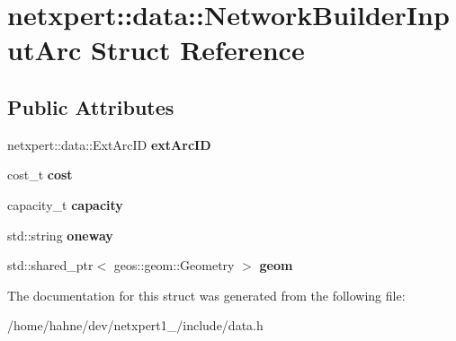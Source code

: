 \hypertarget{structnetxpert_1_1data_1_1NetworkBuilderInputArc}{}\section{netxpert\+:\+:data\+:\+:Network\+Builder\+Input\+Arc Struct Reference}
\label{structnetxpert_1_1data_1_1NetworkBuilderInputArc}
\subsection*{Public Attributes}
\begin{DoxyCompactItemize}
\item 
netxpert\+::data\+::\+Ext\+Arc\+ID {\bfseries ext\+Arc\+ID}\hypertarget{structnetxpert_1_1data_1_1NetworkBuilderInputArc_ae556b3db0db08d8f7028327502ab196f}{}\label{structnetxpert_1_1data_1_1NetworkBuilderInputArc_ae556b3db0db08d8f7028327502ab196f}

\item 
cost\+\_\+t {\bfseries cost}\hypertarget{structnetxpert_1_1data_1_1NetworkBuilderInputArc_a8f63108fb1e20801741acb30cd3e5dfa}{}\label{structnetxpert_1_1data_1_1NetworkBuilderInputArc_a8f63108fb1e20801741acb30cd3e5dfa}

\item 
capacity\+\_\+t {\bfseries capacity}\hypertarget{structnetxpert_1_1data_1_1NetworkBuilderInputArc_a206349fa6fc7b2feb9f0bf4b9ddb2c60}{}\label{structnetxpert_1_1data_1_1NetworkBuilderInputArc_a206349fa6fc7b2feb9f0bf4b9ddb2c60}

\item 
std\+::string {\bfseries oneway}\hypertarget{structnetxpert_1_1data_1_1NetworkBuilderInputArc_a74d7a87d8450550568bc0617619148ba}{}\label{structnetxpert_1_1data_1_1NetworkBuilderInputArc_a74d7a87d8450550568bc0617619148ba}

\item 
std\+::shared\+\_\+ptr$<$ geos\+::geom\+::\+Geometry $>$ {\bfseries geom}\hypertarget{structnetxpert_1_1data_1_1NetworkBuilderInputArc_a7df7b2712355e17a5002863a89499bfc}{}\label{structnetxpert_1_1data_1_1NetworkBuilderInputArc_a7df7b2712355e17a5002863a89499bfc}

\end{DoxyCompactItemize}


The documentation for this struct was generated from the following file\+:\begin{DoxyCompactItemize}
\item 
/home/hahne/dev/netxpert1\+\_/include/data.\+h\end{DoxyCompactItemize}
